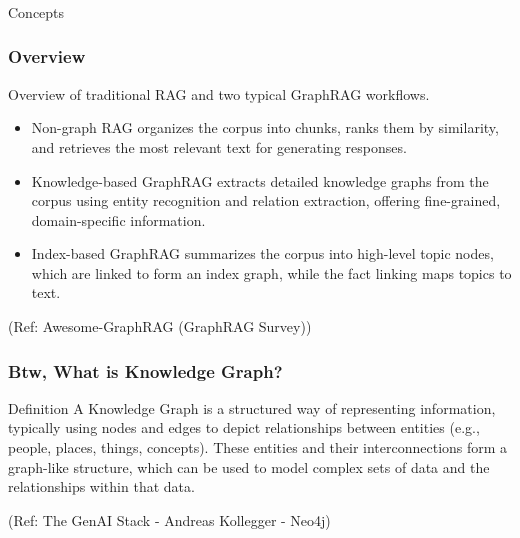 \begin{frame}[fragile]\frametitle{}
\begin{center}
{\Large Concepts}
\end{center}
\end{frame}



\begin{frame}[fragile]\frametitle{Overview}

Overview of traditional RAG and two typical GraphRAG workflows.

    \begin{itemize}
        \item Non-graph RAG organizes the corpus into chunks, ranks them by similarity, and retrieves the most relevant text for generating responses.
        \item Knowledge-based GraphRAG extracts detailed knowledge graphs from the corpus using entity recognition and relation extraction, offering fine-grained, domain-specific information.
        \item Index-based GraphRAG summarizes the corpus into high-level topic nodes, which are linked to form an index graph, while the fact linking maps topics to text.
    \end{itemize}
	
	{\tiny (Ref: Awesome-GraphRAG (GraphRAG Survey))}
	
\end{frame}


\begin{frame}[fragile]\frametitle{Btw, What is Knowledge Graph?}
    \begin{block}{Definition}
A Knowledge Graph is a structured way of representing 
information, typically using nodes and edges to depict 
relationships between entities (e.g., people, places, 
things, concepts). 
These entities and their interconnections form a 
graph-like structure, which can be used to model 
complex sets of data and the relationships within that 
data.
    \end{block}
	
	{\tiny (Ref: The GenAI Stack - Andreas Kollegger - Neo4j)}
	
\end{frame}


